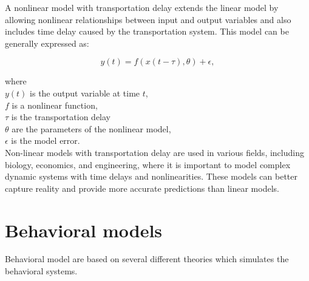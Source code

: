 \documentclass[12pt]{report}
\begin{document}
A nonlinear model with transportation delay extends the linear model by
allowing nonlinear relationships between input and output variables and
also includes time delay caused by the transportation system. This model
can be generally expressed as:

\begin{equation}
    y(t) = f(x(t - \tau), \theta) + \epsilon,
\end{equation}

\noindent where\\
\( y(t) \) is the output variable at time \( t \),\\
\( f \) is a nonlinear function,\\
\( \tau \) is the transportation delay\\
\( \theta \) are the parameters of the nonlinear model,\\
\( \epsilon \) is the model error.\\

\noindent Non-linear models with transportation delay are used in various fields,
including biology, economics, and engineering, where it is important to
model complex dynamic systems with time delays and nonlinearities. 
These models can better capture reality and provide more accurate
predictions than linear models.

\section{Behavioral models}
Behavioral model are based on several different theories which
simulates the behavioral systems.\\
\end{document}
